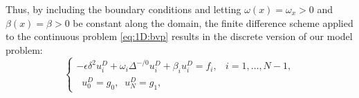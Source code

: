 Thus, by including the boundary conditions and letting $\omega(x)=\omega_x>0$
and $\beta(x) = \beta > 0$ be constant along the domain, the finite difference
scheme applied to the continuous problem \eqref{eq:1D:bvp} results in the
discrete version of our model problem:
%
\begin{equation}
\label{eq:back:1DbvpDiscr}
\begin{cases}
-\epsilon \delta^2 u^D_i + \omega_i \Delta^{-/0}u^D_i +\beta_i u^D_i = f_i, & i=1,\ldots,N-1,\\
\;\;u^D_0=g_0,\;\;u^D_N=g_1, &
\end{cases}
\end{equation}

